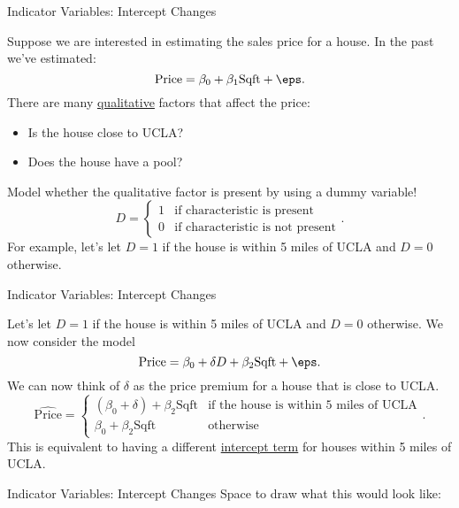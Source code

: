 \documentclass[notheorems, 9pt]{beamer}
\begin{document}
\begin{frame}{Indicator Variables: Intercept Changes} %
	\label{frame:intercept-changes} %
	\begin{example*}
		Suppose we are interested in estimating the sales price for a house. In the past we've estimated:
		\[
			\text{Price} = \beta_0 + \beta_1\text{Sqft} + \eps
		.\]
		 There are many \underline{qualitative} factors that affect the price:
		\begin{itemize}
			\item Is the house close to UCLA?
			\item Does the house have a pool?
		\end{itemize}
		\vspace{0.3cm}
		 Model whether the qualitative factor is present by using a dummy variable!
		\[
		    D = \begin{cases}
		    	1 & \text{if characteristic is present} \\
				0 & \text{if characteristic is not present}
		    \end{cases}
		.\] 
		For example, let's let \(D= 1\) if the house is within 5 miles of UCLA and  \(D= 0\) otherwise.
	\end{example*}
\end{frame}
\begin{frame}{Indicator Variables: Intercept Changes} %
	\begin{example*}
		Let's let \(D= 1\) if the house is within 5 miles of UCLA and  \(D= 0\) otherwise. We now consider the model 
		\[
			\text{Price} = \beta_0 + \delta D + \beta_2\text{Sqft} + \eps
		.\] 
		 We can now think of \(\delta\) as the price premium for a house that is close to UCLA.
		\[
			\widehat{\text{Price}} = \begin{cases}
				(\beta_0 + \delta)  + \beta_2\text{Sqft}& \text{if the house is within 5 miles of UCLA} \\
				\beta_0 + \beta_2\text{Sqft} &\text{otherwise}
			\end{cases}
		.\] 
		This is equivalent to having a different \underline{intercept term} for houses within 5 miles of UCLA. 
	\end{example*}
\end{frame}
\begin{frame}[t]{Indicator Variables: Intercept Changes} %
	\label{frame:indicator-intercept} %
	Space to draw what this would look like:
\end{frame}
\end{document}
